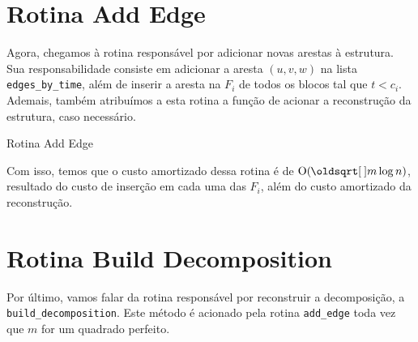 \section{Rotina Add Edge}
\label{sec:rmsf-add-edge}

Agora, chegamos à rotina responsável por adicionar novas arestas à estrutura. Sua responsabilidade consiste em adicionar a aresta $(u,v,w)$ na lista \texttt{edges\_by\_time}, além de inserir a aresta na $F_i$ de todos os blocos tal que $t < c_i$. Ademais, também atribuímos a esta rotina a função de acionar a reconstrução da estrutura, caso necessário.

\begin{algorithm}[h!]
    \caption{Rotina Add Edge}\label{rmsf-add-edge}
    \begin{algorithmic}[1]
        \EndFor
        \EndIf
        \EndFunction
    \end{algorithmic}
\end{algorithm}

Com isso, temos que o custo amortizado dessa rotina é de $\Oh(\sqrt{m} \log{n})$, resultado do custo de inserção em cada uma das $F_i$, além do custo amortizado da reconstrução.

\section{Rotina Build Decomposition}
\label{sec:rmsf-build-decomposition}

Por último, vamos falar da rotina responsável por reconstruir a decomposição, a \texttt{build\_decomposition}. Este método é acionado pela rotina \texttt{add\_edge} toda vez que $m$ for um quadrado perfeito.


